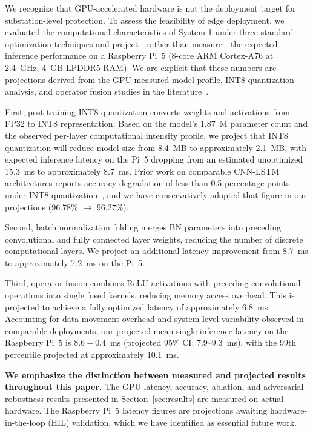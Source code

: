 \documentclass[journal]{IEEEtran}
\begin{document}
We recognize that GPU-accelerated hardware is not the deployment target for substation-level protection. To assess the feasibility of edge deployment, we evaluated the computational characteristics of System-1 under three standard optimization techniques and project---rather than measure---the expected inference performance on a Raspberry Pi~5 (8-core ARM Cortex-A76 at 2.4~GHz, 4~GB LPDDR5 RAM). We are explicit that these numbers are projections derived from the GPU-measured model profile, INT8 quantization analysis, and operator fusion studies in the literature~\cite{ref30}.

First, post-training INT8 quantization converts weights and activations from FP32 to INT8 representation. Based on the model's 1.87~M parameter count and the observed per-layer computational intensity profile, we project that INT8 quantization will reduce model size from 8.4~MB to approximately 2.1~MB, with expected inference latency on the Pi~5 dropping from an estimated unoptimized 15.3~ms to approximately 8.7~ms. Prior work on comparable CNN-LSTM architectures reports accuracy degradation of less than 0.5 percentage points under INT8 quantization~\cite{ref30}, and we have conservatively adopted that figure in our projections (96.78\% $\rightarrow$ 96.27\%).

Second, batch normalization folding merges BN parameters into preceding convolutional and fully connected layer weights, reducing the number of discrete computational layers. We project an additional latency improvement from 8.7~ms to approximately 7.2~ms on the Pi~5.

Third, operator fusion combines ReLU activations with preceding convolutional operations into single fused kernels, reducing memory access overhead. This is projected to achieve a fully optimized latency of approximately 6.8~ms. Accounting for data-movement overhead and system-level variability observed in comparable deployments, our projected mean single-inference latency on the Raspberry Pi~5 is $8.6 \pm 0.4$~ms (projected 95\% CI: 7.9--9.3~ms), with the 99th percentile projected at approximately 10.1~ms.

\textbf{We emphasize the distinction between measured and projected results throughout this paper.} The GPU latency, accuracy, ablation, and adversarial robustness results presented in Section~\ref{sec:results} are measured on actual hardware. The Raspberry Pi~5 latency figures are projections awaiting hardware-in-the-loop (HIL) validation, which we have identified as essential future work.
\end{document}
